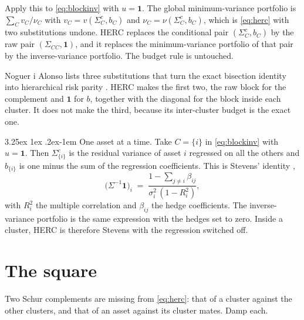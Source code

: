 \documentclass[11pt]{article}
\makeatletter
\renewcommand\paragraph{\@startsection{paragraph}{4}{\z@}%
  {3.25ex \@plus1ex \@minus.2ex}{-1em}%
  {\normalfont\normalsize\itshape}}
\newcommand{\ones}{\mathbf{1}}
\makeatother
\begin{document}
Apply this to \eqref{eq:blockinv} with $u=\ones$. The global
minimum-variance portfolio is $\sum_C v_C/\nu_C$ with
$v_C=v(\Sigma^c_C,b_C)$ and $\nu_C=\nu(\Sigma^c_C,b_C)$, which is
\eqref{eq:herc} with two substitutions undone. HERC replaces the
conditional pair $(\Sigma^c_C,b_C)$ by the raw pair $(\Sigma_{CC},\ones)$,
and it replaces the minimum-variance portfolio of that pair by the
inverse-variance portfolio. The budget rule is untouched.

Noguer i Alonso lists three substitutions that turn the exact bisection
identity into hierarchical risk parity \cite{lopezdeprado2016,noguer2026}. HERC makes the
first two, the raw block for the complement and $\ones$ for $b$, together
with the diagonal for the block inside each cluster. It does not make the
third, because its inter-cluster budget is the exact one.

\paragraph{One asset at a time.} Take $C=\{i\}$ in \eqref{eq:blockinv} with
$u=\ones$. Then $\Sigma^c_{\{i\}}$ is the residual variance of asset $i$
regressed on all the others and $b_{\{i\}}$ is one minus the sum of the
regression coefficients. This is Stevens' identity \cite{stevens1998},
\begin{equation}
  \big(\Sigma^{-1}\ones\big)_i
  \;=\;\frac{1-\sum_{j\ne i}\beta_{ij}}{\sigma_i^2\,(1-R_i^2)} ,
  \label{eq:stevens}
\end{equation}
with $R_i^2$ the multiple correlation and $\beta_{ij}$ the hedge
coefficients. The inverse-variance portfolio is the same expression with
the hedges set to zero. Inside a cluster, HERC is therefore Stevens with
the regression switched off.

\section{The square}
\label{sec:square}

Two Schur complements are missing from \eqref{eq:herc}: that of a cluster
against the other clusters, and that of an asset against its cluster
mates. Damp each.
\end{document}
